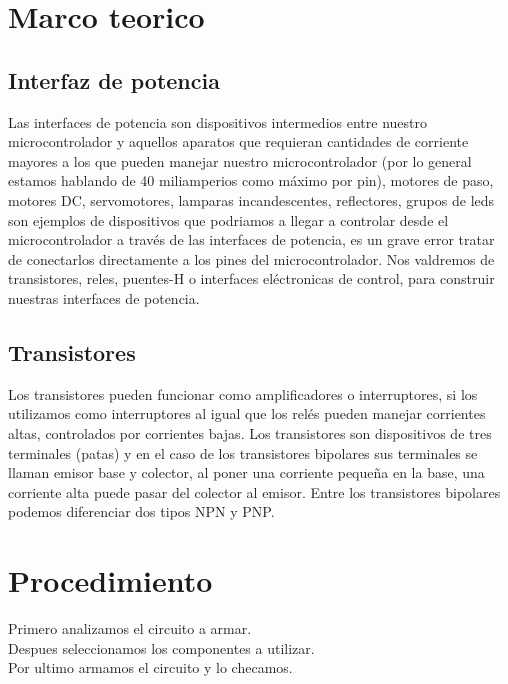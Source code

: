 \documentclass[12pt,a4paper]{article}
\begin{document}
\section{Marco teorico}
\subsection{Interfaz de potencia}
Las interfaces de potencia son dispositivos intermedios entre nuestro microcontrolador y aquellos aparatos que requieran cantidades de corriente mayores a los que pueden manejar nuestro microcontrolador (por lo general estamos hablando de 40 miliamperios como máximo por pin), motores de paso, motores DC, servomotores, lamparas incandescentes, reflectores, grupos de leds son ejemplos de dispositivos que podriamos a llegar a controlar desde el microcontrolador a través de las interfaces de potencia, es un grave error tratar de conectarlos directamente a los pines del microcontrolador. Nos valdremos de transistores, reles, puentes-H o interfaces eléctronicas de control, para construir nuestras interfaces de potencia.


\subsection{Transistores}
Los transistores pueden funcionar como amplificadores o interruptores, si los utilizamos como interruptores al igual que los relés pueden manejar corrientes altas, controlados por corrientes bajas. Los transistores son dispositivos de tres terminales (patas) y en el caso de los transistores bipolares sus terminales se llaman emisor base y colector, al poner una corriente pequeña en la base, una corriente alta puede pasar del colector al emisor. Entre los transistores bipolares podemos diferenciar dos tipos NPN y PNP.


\section{Procedimiento}
Primero analizamos el circuito a armar.\\
Despues seleccionamos los componentes a utilizar.\\
Por ultimo armamos el circuito y lo checamos.\\
\end{document}
